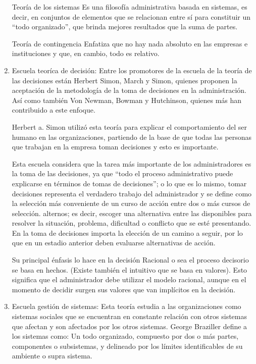 \documentclass[letterpaper,12pt]{article}
\begin{document}
\begin{sloppypar}
\begin{enumerate}
    Teoría de los sistemas
    Es una filosofía administrativa basada en sistemas, es decir, en conjuntos de elementos que se relacionan entre sí para constituir un “todo organizado”, que brinda mejores resultados que la suma de partes.

    Teoría de contingencia
    Enfatiza que no hay nada absoluto en las empresas e instituciones y que, en cambio, todo es relativo.

    \item Escuela teoríca de decisión:  
    Entre  los  promotores  de  la  escuela  de  la  teoría  de  las  decisiones  están  Herbert Simon, March y Simon, quienes proponen la aceptación de la metodología de la toma  de  decisiones  en  la  administración.  Así  como  también  Von  Newman, Bowman  y  Hutchinson,  quienes  más  han  contribuido  a  este  enfoque.

    Herbert  a. Simon  utilizó esta  teoría  para  explicar el  comportamiento del  ser  humano en las organizaciones, partiendo de la base de que todas las personas que trabajan en la  empresa  toman  decisiones  y  esto  es  importante.

    Esta escuela considera que la tarea más importante de los administradores es la toma de las decisiones, ya que “todo el proceso administrativo puede explicarse en  términos  de  tomas  de  decisiones”;  o  lo  que  es  lo  mismo,  tomar  decisiones representa el verdadero trabajo del administrador y se define como la selección más  conveniente  de  un  curso  de  acción  entre  dos  o  más  cursos  de  selección. alternos;  es  decir,  escoger  una  alternativa  entre  las  disponibles  para  resolver  la situación, problema, dificultad o conflicto que se esté presentando. En la toma de decisiones  importa la  elección  de  un camino  a  seguir, por lo que en un estadio anterior  deben  evaluarse  alternativas  de  acción. 

    Su principal énfasis lo hace en la decisión Racional o sea el proceso decisorio se basa en hechos. (Existe también el intuitivo que se basa en valores). Esto significa que el administrador debe utilizar el modelo racional, aunque en el momento de decidir  surgen  sus  valores  que  van  implícitos  en  la  decisión.
    \newpage
    \item Escuela gestión de sistemas: Esta teoría estudia a las organizaciones como sistemas sociales que se encuentran en constante relación con otros sistemas que afectan y son afectados por los otros sistemas. George Braziller define a los sistemas como: Un todo organizado, compuesto por dos o más partes, componentes o subsistemas, y delineado por los límites identificables de su ambiente o supra sistema. 


\end{enumerate}
\end{sloppypar}
\end{document}
